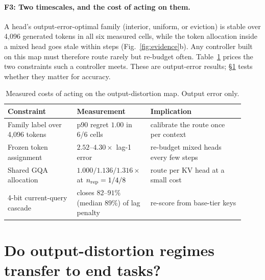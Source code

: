 \documentclass{article}
\theoremstyle{definition}
\begin{document}
\paragraph{F3: Two timescales, and the cost of acting on them.}
A head's output-error-optimal family (interior, uniform, or eviction) is stable over 4,096 generated tokens in all six measured cells, while the token allocation inside a mixed head goes stale within steps (Fig.~\ref{fig:evidence}b).  Any controller built on this map must therefore route rarely but re-budget often.  Table~\ref{tab:deployment} prices the two constraints such a controller meets.  These are output-error results; \S\ref{sec:endtask} tests whether they matter for accuracy.

\begin{table}[t]
\centering
\small
\setlength{\tabcolsep}{4pt}
\caption{Measured costs of acting on the output-distortion map. Output error only.}
\label{tab:deployment}
\begin{tabular}{@{}p{0.29\linewidth}p{0.25\linewidth}p{0.38\linewidth}@{}}
\toprule
\textbf{Constraint} & \textbf{Measurement} & \textbf{Implication} \\
\midrule
Family label over 4,096 tokens & p90 regret $1.00$ in 6/6 cells & calibrate the route once per context \\
Frozen token assignment & $2.52$--$4.30\times$ lag-1 error & re-budget mixed heads every few steps \\
Shared GQA allocation & $1.000/1.136/1.316\times$ at $n_{\rm rep}=1/4/8$ & route per KV head at a small cost \\
4-bit current-query cascade & closes $82$--$91\%$ (median $89\%$) of lag penalty & re-score from base-tier keys \\
\bottomrule
\end{tabular}
\vspace{-2mm}
\end{table}

\section{Do output-distortion regimes transfer to end tasks?}
\label{sec:endtask}
\end{document}

